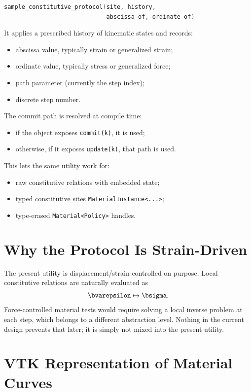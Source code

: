 \begin{lstlisting}[language=C++]
sample_constitutive_protocol(site, history,
                             abscissa_of, ordinate_of)
\end{lstlisting}

It applies a prescribed history of kinematic states and records:

\begin{itemize}
  \item abscissa value, typically strain or generalized strain;
  \item ordinate value, typically stress or generalized force;
  \item path parameter (currently the step index);
  \item discrete step number.
\end{itemize}

The commit path is resolved at compile time:

\begin{itemize}
  \item if the object exposes \texttt{commit(k)}, it is used;
  \item otherwise, if it exposes \texttt{update(k)}, that path is used.
\end{itemize}

This lets the same utility work for:

\begin{itemize}
  \item raw constitutive relations with embedded state;
  \item typed constitutive sites \texttt{MaterialInstance<...>};
  \item type-erased \texttt{Material<Policy>} handles.
\end{itemize}

\section{Why the Protocol Is Strain-Driven}

The present utility is displacement/strain-controlled on purpose.  Local
constitutive relations are naturally evaluated as
\[
\bvarepsilon \mapsto \bsigma.
\]
Force-controlled material tests would require solving a local inverse problem
at each step, which belongs to a different abstraction level.  Nothing in the
current design prevents that later; it is simply not mixed into the present
utility.

\section{VTK Representation of Material Curves}

